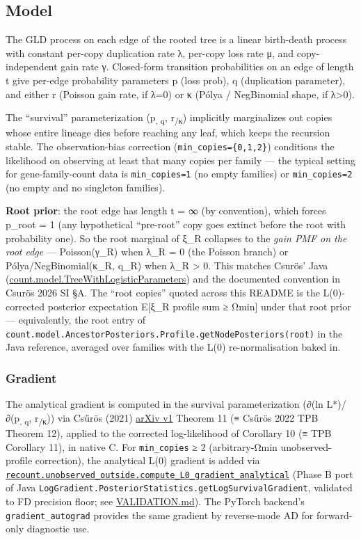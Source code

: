 \documentclass[
  10pt,
]{article}
\begin{document}
\subsection{Model}\label{model}

The GLD process on each edge of the rooted tree is a linear birth-death
process with constant per-copy duplication rate λ, per-copy loss rate μ,
and copy-independent gain rate γ. Closed-form transition probabilities
on an edge of length t give per-edge probability parameters p (loss
prob), q (duplication parameter), and either r (Poisson gain rate, if
λ=0) or κ (Pólya / NegBinomial shape, if λ\textgreater0).

The ``survival'' parameterization (p\textsubscript{, q},
r\textsubscript{/κ}) implicitly marginalizes out copies whose entire
lineage dies before reaching any leaf, which keeps the recursion stable.
The observation-bias correction (\texttt{min\_copies=\{0,1,2\}})
conditions the likelihood on observing at least that many copies per
family --- the typical setting for gene-family-count data is
\texttt{min\_copies=1} (no empty families) or \texttt{min\_copies=2} (no
empty and no singleton families).

\textbf{Root prior}: the root edge has length t = ∞ (by convention),
which forces p\_root = 1 (any hypothetical ``pre-root'' copy goes
extinct before the root with probability one). So the root marginal of
ξ\_R collapses to the \emph{gain PMF on the root edge} --- Poisson(γ\_R)
when λ\_R = 0 (the Poisson branch) or Pólya/NegBinomial(κ\_R, q\_R) when
λ\_R \textgreater{} 0. This matches Csurös' Java
(\href{https://github.com/miklosc/Count/blob/master/src/count/model/TreeWithLogisticParameters.java}{count.model.TreeWithLogisticParameters})
and the documented convention in Csurös 2026 SI §A. The ``root copies''
quoted across this README is the L(0)-corrected posterior expectation
E{[}ξ\_R \textbar{} profile sum ≥ Ωmin{]} under that root prior ---
equivalently, the root entry of
\texttt{count.model.AncestorPosteriors.Profile.getNodePosteriors(root)}
in the Java reference, averaged over families with the L(0)
re-normalisation baked in.

\subsubsection{Gradient}\label{gradient}

The analytical gradient is computed in the survival parameterization
(∂(ln L*)/∂(p\textsubscript{, q}, r\textsubscript{/κ})) via Csűrös
(2021) \href{https://arxiv.org/abs/2107.11440}{arXiv v1} Theorem 11 (≡
Csűrös 2022 TPB Theorem 12), applied to the corrected log-likelihood of
Corollary 10 (≡ TPB Corollary 11), in native C. For \texttt{min\_copies}
≥ 2 (arbitrary-Ωmin unobserved-profile correction), the analytical L(0)
gradient is added via
\href{recount/unobserved_outside.py}{\texttt{recount.unobserved\_outside.compute\_L0\_gradient\_analytical}}
(Phase B port of Java
\texttt{LogGradient.PosteriorStatistics.getLogSurvivalGradient},
validated to FD precision floor; see \url{VALIDATION.md}). The PyTorch
backend's \texttt{gradient\_autograd} provides the same gradient by
reverse-mode AD for forward-only diagnostic use.
\end{document}
